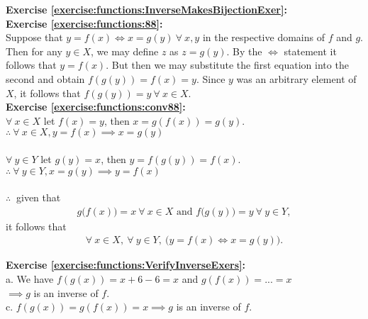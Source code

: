 \noindent\textbf{Exercise \ref{exercise:functions:InverseMakesBijectionExer}:}\\

\noindent\textbf{Exercise \ref{exercise:functions:88}:}\\ %
Suppose that  $y = f(x)\Leftrightarrow x = g(y)\ \forall\ x,y$ in the respective domains of $f$ and $g$. Then for any $y\in X$, we may define $z$ as $z = g(y)$. By the $\Leftrightarrow$ statement it follows that $y = f(x)$. But then we may substitute the first equation into the second and obtain $f(g(y)) = f(x) = y$. Since $y$ was an arbitrary element of $X$, it follows that $f(g(y)) = y\ \forall\ x\in X$.\\

\noindent\textbf{Exercise \ref{exercise:functions:conv88}:}\\ %
$\forall\ x\in X$ let $f(x) = y$, then $x = g(f(x)) = g(y)$.\\
$\therefore\ \forall\ x\in X, y = f(x) \implies x = g(y)$\\
\\  
$\forall\ y\in Y$ let $g(y) = x$, then $y = f(g(y)) = f(x)$.\\
$\therefore\ \forall\ y\in Y, x = g(y) \implies y = f(x)$\\
\\   
$\therefore\ $ given that
\begin{align*}
g\bigl(f(x) \bigr) = x\ \forall\ x \in X \text{\ and\ } f\bigl(g(y)\bigr) = y\ \forall\ y\in Y,
\end{align*}
it follows that
\begin{align*} 
\forall\ x\in X,\ \forall\ y\in Y,\ \bigl(y=f(x) \Leftrightarrow x = g(y)\bigr).
\end{align*} 

\noindent\textbf{Exercise \ref{exercise:functions:VerifyInverseExers}:}\\
a. We have $f(g(x))=x+6-6=x$ and $g(f(x))=...=x$\\
$\implies g$ is an inverse of $f$.\\
c. $f(g(x))=g(f(x))=x \implies g$ is an inverse of $f$.\\

